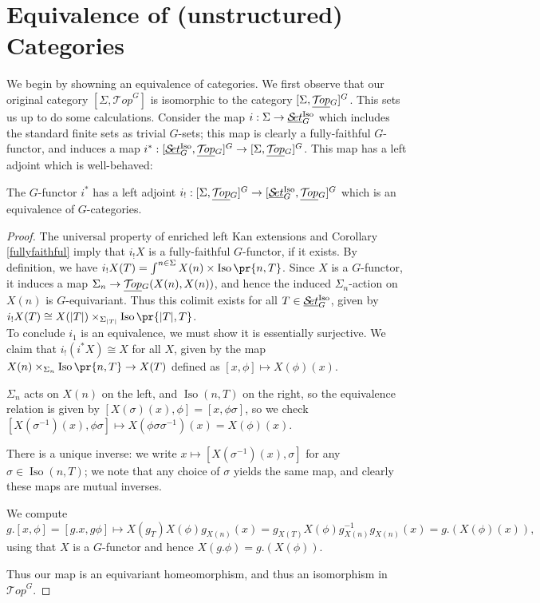 \documentclass{report}
\newcommand{\Top}{\text{$\mathcal{T}\!op$}}
\newcommand{\Set}{\text{$\mathcal{S}\!et$}}
\DeclareMathOperator{\Iso}{Iso}
\newcommand{\iso}[1]{\text{$\Iso\pr{#1}$}}
\newcommand{\TopG}{\text{\underline{$\Top$}$_G$}}
\newcommand{\SetG}{\text{\underline{$\Set$}$_G^{\mbox{\scriptsize Iso}}$}}
\renewcommand{\ST}{\text{$[\SetG,\TopG]^G$}}
\begin{document}
\section{Equivalence of (unstructured) Categories}
We begin by showning an equivalence of categories. 
We first observe that our original category  $[\Sigma, \Top^G]$ is isomorphic to the category $[\Sigma,\TopG]^G$. This sets us up to do some calculations. Consider the map $i: \Sigma\to \SetG$ which includes the standard finite sets as trivial $G$-sets; this map is clearly a fully-faithful $G$-functor, and induces a map $i^*: \ST \to [\Sigma,\TopG]^G$. This map has a left adjoint which is well-behaved:
\begin{lemma}
  The $G$-functor $i^*$ has a left adjoint $i_!: [\Sigma,\TopG]^G\to\ST$ which is an equivalence of $G$-categories.
\end{lemma}
\begin{proof}
  The universal property of enriched left Kan extensions and Corollary \ref{fullyfaithful} imply that $i_!X$ is a fully-faithful $G$-functor, if it exists. By definition, we have $i_!X(T) = \int^{n\in\Sigma}X(n)\times\iso{n,T}$. Since $X$ is a $G$-functor, it induces a map $\Sigma_n\to\TopG(X(n),X(n))$, and hence the induced $\Sigma_n$-action on $X(n)$ is $G$-equivariant. Thus this colimit exists for all $T\in\SetG$, given by $i_!X(T) \cong X(|T|)\times_{\Sigma_{|T|}}\iso{|T|,T}$.\\   
  To conclude $i_1$ is an equivalence, we must show it is essentially surjective. We claim that $i_!(i^*X)\cong X$ for all $X$, given by the map $X(n)\times_{\Sigma_n}\iso{n,T}\to X(T)$ defined as $[x, \phi]\mapsto X(\phi)(x)$.
  \begin{description}\itemsep-4pt
  \item[well-defined] $\Sigma_n$ acts on $X(n)$ on the left, and $\Iso(n,T)$ on the right, so the equivalence relation is given by $[X(\sigma)(x), \phi] = [x,\phi\sigma]$, so we check $[X(\sigma^{-1})(x), \phi\sigma]\mapsto X(\phi\sigma\sigma^{-1})(x) = X(\phi)(x)$.
  \item[homeomorphism] There is a unique inverse: we write $x\mapsto [X(\sigma^{-1})(x), \sigma]$ for any $\sigma\in\Iso(n,T)$; we note that any choice of $\sigma$ yields the same map, and clearly these maps are mutual inverses.
  \item[equivariant] We compute
    \[g.[x, \phi]=[g.x,  g\phi] \mapsto X(g_T)X(\phi)g_{X(n)}(x) = g_{X(T)}X(\phi)g_{X(n)}^{-1}g_{X(n)}(x) = g.(X(\phi)(x)),\]
    using that $X$ is a $G$-functor and hence $X(g.\phi) = g.(X(\phi))$.   
  \end{description}
  Thus our map is an equivariant homeomorphism, and thus an isomorphism in $\Top^G$.
\end{proof}
\end{document}
